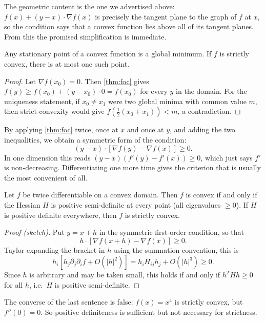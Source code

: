 \documentclass[a4paper]{scrartcl}
\begin{document}
The geometric content is the one we advertised above: $f(x) + (y - x)\cdot\nabla f(x)$ is precisely the tangent plane to the graph of $f$ at $x$, so the condition says that a convex function lies above all of its tangent planes. From this the promised simplification is immediate.

\begin{corollary}
	Any stationary point of a convex function is a global minimum. If $f$ is strictly convex, there is at most one such point.
\end{corollary}
\begin{proof}
	Let $\nabla f(x_0) = 0$. Then \autoref{thm:foc} gives $f(y) \geq f(x_0) + (y - x_0)\cdot 0 = f(x_0)$ for every $y$ in the domain. For the uniqueness statement, if $x_0 \neq x_1$ were two global minima with common value $m$, then strict convexity would give $f(\frac{1}{2}(x_0 + x_1)) < m$, a contradiction.
\end{proof}

By applying \autoref{thm:foc} twice, once at $x$ and once at $y$, and adding the two inequalities, we obtain a symmetric form of the condition:
$$
(y - x)\cdot\left[\nabla f(y) - \nabla f(x)\right] \geq 0.
$$
In one dimension this reads $(y-x)(f'(y) - f'(x)) \geq 0$, which just says $f'$ is non-decreasing. Differentiating one more time gives the criterion that is usually the most convenient of all.

\begin{theorem}
	Let $f$ be twice differentiable on a convex domain. Then $f$ is convex if and only if the Hessian $H$ is positive semi-definite at every point (all eigenvalues $\geq 0$). If $H$ is positive definite everywhere, then $f$ is strictly convex.
\end{theorem}
\begin{proof}[Proof (sketch)]
	Put $y = x + h$ in the symmetric first-order condition, so that
	$$
	h \cdot \left[\nabla f(x + h) - \nabla f(x)\right] \geq 0.
	$$
	Taylor expanding the bracket in $h$ using the summation convention, this is
	$$
	h_i\left[h_j \partial_j\partial_i f + O(|h|^2)\right] = h_i H_{ij}h_j + O(|h|^3) \geq 0.
	$$
	Since $h$ is arbitrary and may be taken small, this holds if and only if $h^T H h \geq 0$ for all $h$, i.e.\ $H$ is positive semi-definite.
\end{proof}

\begin{remark}
	The converse of the last sentence is false: $f(x) = x^4$ is strictly convex, but $f''(0) = 0$. So positive definiteness is sufficient but not necessary for strictness.
\end{remark}
\end{document}
